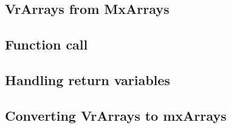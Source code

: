 \subsection{VrArrays from MxArrays}
\subsection{Function call}
\subsection{Handling return variables}
\subsection{Converting VrArrays to mxArrays}
